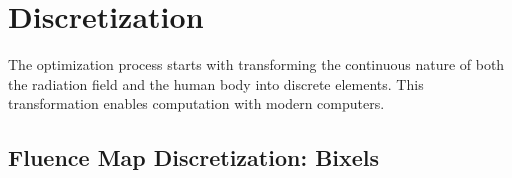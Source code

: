 \section{Discretization}
The optimization process starts with transforming the continuous nature of both the radiation field and the human body into discrete elements.
This transformation enables computation with modern computers.

\subsection[Bixels]{Fluence Map Discretization: Bixels}


